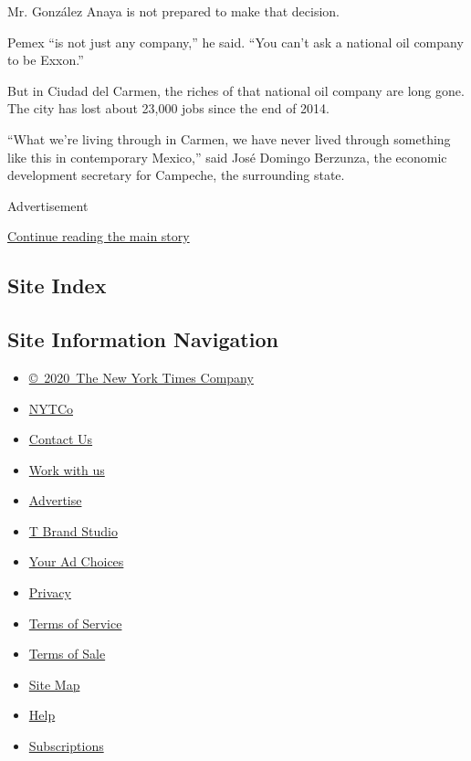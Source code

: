 Mr. González Anaya is not prepared to make that decision.

Pemex ``is not just any company,'' he said. ``You can't ask a national
oil company to be Exxon.''

But in Ciudad del Carmen, the riches of that national oil company are
long gone. The city has lost about 23,000 jobs since the end of 2014.

``What we're living through in Carmen, we have never lived through
something like this in contemporary Mexico,'' said José Domingo
Berzunza, the economic development secretary for Campeche, the
surrounding state.

Advertisement

\protect\hyperlink{after-bottom}{Continue reading the main story}

\hypertarget{site-index}{%
\subsection{Site Index}\label{site-index}}

\hypertarget{site-information-navigation}{%
\subsection{Site Information
Navigation}\label{site-information-navigation}}

\begin{itemize}
\tightlist
\item
  \href{https://help.nytimes3xbfgragh.onion/hc/en-us/articles/115014792127-Copyright-notice}{©~2020~The
  New York Times Company}
\end{itemize}

\begin{itemize}
\tightlist
\item
  \href{https://www.nytco.com/}{NYTCo}
\item
  \href{https://help.nytimes3xbfgragh.onion/hc/en-us/articles/115015385887-Contact-Us}{Contact
  Us}
\item
  \href{https://www.nytco.com/careers/}{Work with us}
\item
  \href{https://nytmediakit.com/}{Advertise}
\item
  \href{http://www.tbrandstudio.com/}{T Brand Studio}
\item
  \href{https://www.nytimes3xbfgragh.onion/privacy/cookie-policy\#how-do-i-manage-trackers}{Your
  Ad Choices}
\item
  \href{https://www.nytimes3xbfgragh.onion/privacy}{Privacy}
\item
  \href{https://help.nytimes3xbfgragh.onion/hc/en-us/articles/115014893428-Terms-of-service}{Terms
  of Service}
\item
  \href{https://help.nytimes3xbfgragh.onion/hc/en-us/articles/115014893968-Terms-of-sale}{Terms
  of Sale}
\item
  \href{https://spiderbites.nytimes3xbfgragh.onion}{Site Map}
\item
  \href{https://help.nytimes3xbfgragh.onion/hc/en-us}{Help}
\item
  \href{https://www.nytimes3xbfgragh.onion/subscription?campaignId=37WXW}{Subscriptions}
\end{itemize}
